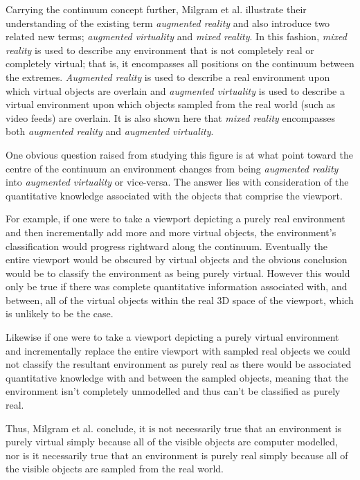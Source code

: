 Carrying the continuum concept further, Milgram et al. illustrate their understanding of the existing term \textit{augmented reality} and also introduce two related new terms; \textit{augmented virtuality} and \textit{mixed reality}. In this fashion, \textit{mixed reality} is used to describe any environment that is not completely real or completely virtual; that is, it encompasses all positions on the continuum between the extremes. \textit{Augmented reality} is used to describe a real environment upon which virtual objects are overlain and \textit{augmented virtuality} is used to describe a virtual environment upon which objects sampled from the real world (such as video feeds) are overlain. It is also shown here that \textit{mixed reality} encompasses both \textit{augmented reality} and \textit{augmented virtuality}.

One obvious question raised from studying this figure is at what point toward the centre of the continuum an environment changes from being \textit{augmented reality} into \textit{augmented virtuality} or vice-versa. The answer lies with consideration of the quantitative knowledge associated with the objects that comprise the viewport.

For example, if one were to take a viewport depicting a purely real environment and then incrementally add more and more virtual objects, the environment's classification would progress rightward along the continuum. Eventually the entire viewport would be obscured by virtual objects and the obvious conclusion would be to classify the environment as being purely virtual. However this would only be true if there was complete quantitative information associated with, and between, all of the virtual objects within the real 3D space of the viewport, which is unlikely to be the case.

Likewise if one were to take a viewport depicting a purely virtual environment and incrementally replace the entire viewport with sampled real objects we could not classify the resultant environment as purely real as there would be associated quantitative knowledge with and between the sampled objects, meaning that the environment isn't completely unmodelled and thus can't be classified as purely real.

Thus, Milgram et al. conclude, it is not necessarily true that an environment is purely virtual simply because all of the visible objects are computer modelled, nor is it necessarily true that an environment is purely real simply because all of the visible objects are sampled from the real world.

